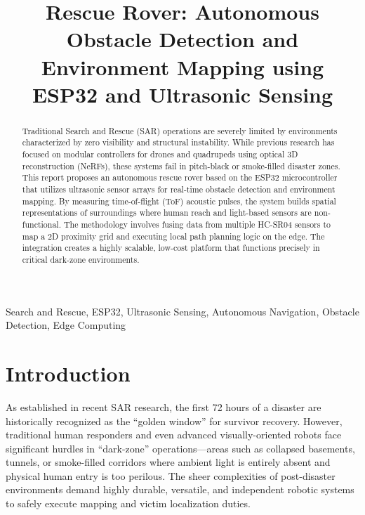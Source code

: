 \documentclass[conference]{IEEEtran}
\begin{document}
\title{Rescue Rover: Autonomous Obstacle Detection and Environment Mapping using ESP32 and Ultrasonic Sensing}

\author{
\and
{}
}

\maketitle

\begin{abstract}
Traditional Search and Rescue (SAR) operations are severely limited by environments characterized by zero visibility and structural instability. While previous research has focused on modular controllers for drones and quadrupeds using optical 3D reconstruction (NeRFs), these systems fail in pitch-black or smoke-filled disaster zones. This report proposes an autonomous rescue rover based on the ESP32 microcontroller that utilizes ultrasonic sensor arrays for real-time obstacle detection and environment mapping. By measuring time-of-flight (ToF) acoustic pulses, the system builds spatial representations of surroundings where human reach and light-based sensors are non-functional. The methodology involves fusing data from multiple HC-SR04 sensors to map a 2D proximity grid and executing local path planning logic on the edge. The integration creates a highly scalable, low-cost platform that functions precisely in critical dark-zone environments.
\end{abstract}

\begin{IEEEkeywords}
Search and Rescue, ESP32, Ultrasonic Sensing, Autonomous Navigation, Obstacle Detection, Edge Computing
\end{IEEEkeywords}

\section{Introduction}
As established in recent SAR research, the first 72 hours of a disaster are historically recognized as the ``golden window'' for survivor recovery. However, traditional human responders and even advanced visually-oriented robots face significant hurdles in ``dark-zone'' operations—areas such as collapsed basements, tunnels, or smoke-filled corridors where ambient light is entirely absent and physical human entry is too perilous. The sheer complexities of post-disaster environments demand highly durable, versatile, and independent robotic systems to safely execute mapping and victim localization duties.
\end{document}
